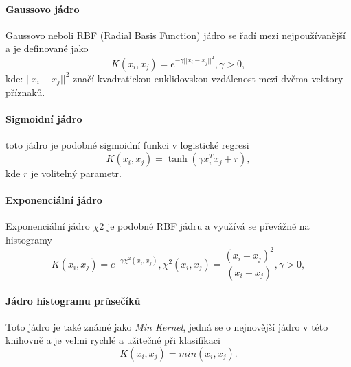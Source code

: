 \paragraph{Gaussovo jádro}
Gaussovo neboli RBF (Radial Basis Function) jádro se řadí mezi nejpoužívanější a je definované jako
\begin{equation*}
\label{RBFK}
 K(x_i, x_j) = e^{-\gamma ||x_i - x_j||^2}, \gamma > 0,
\end{equation*}
kde: $||x_i - x_j||^2$ značí kvadratickou euklidovskou vzdálenost mezi dvěma vektory příznaků.

\paragraph{Sigmoidní jádro}
toto jádro je podobné sigmoidní funkci v logistické regresi
\begin{equation*}
\label{sigmK}
 K(x_i, x_j) = \tanh(\gamma x_i^T x_j + r),
\end{equation*}
kde $r$ je volitelný parametr.

\paragraph{Exponenciální jádro}
Exponenciální jádro $\chi$2 je podobné RBF jádru a využívá se převážně na histogramy
\begin{equation*}
\label{expK}
 K(x_i, x_j) = e^{-\gamma \chi^2(x_i,x_j)}, \chi^2(x_i,x_j) = \frac{(x_i-x_j)^2}{(x_i+x_j)}, \gamma > 0,
\end{equation*}

\paragraph{Jádro histogramu průsečíků}
Toto jádro je také známé jako \textit{Min Kernel}, jedná se o nejnovější jádro v této knihovně a je velmi rychlé a užitečné při klasifikaci
\begin{equation*}
\label{innK}
 K(x_i, x_j) = min(x_i,x_j).
\end{equation*}

